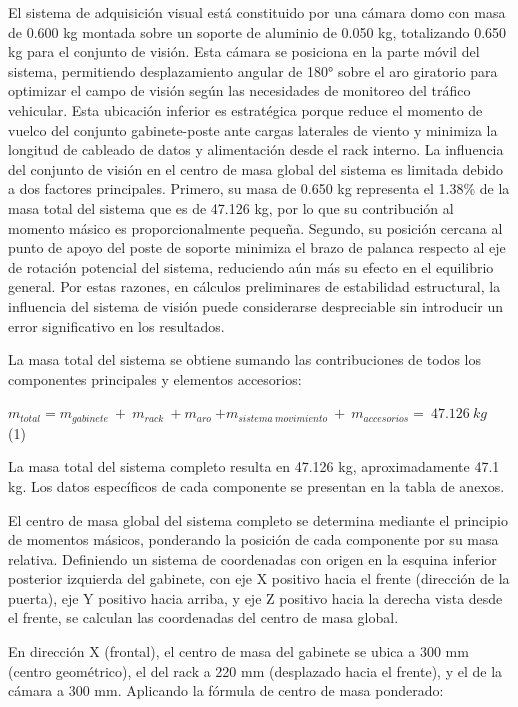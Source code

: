 \documentclass[12pt,a4paper,oneside]{report}
\begin{document}
El sistema de adquisición visual está constituido por una cámara domo con masa de 0.600 kg montada sobre un soporte de aluminio de 0.050 kg, totalizando 0.650 kg para el conjunto de visión. Esta cámara se posiciona en la parte móvil del sistema, permitiendo desplazamiento angular de 180° sobre el aro giratorio para optimizar el campo de visión según las necesidades de monitoreo del tráfico vehicular. Esta ubicación inferior es estratégica porque reduce el momento de vuelco del conjunto gabinete-poste ante cargas laterales de viento y minimiza la longitud de cableado de datos y alimentación desde el rack interno. La influencia del conjunto de visión en el centro de masa global del sistema es limitada debido a dos factores principales. Primero, su masa de 0.650 kg representa el 1.38\% de la masa total del sistema que es de 47.126 kg, por lo que su contribución al momento másico es proporcionalmente pequeña. Segundo, su posición cercana al punto de apoyo del poste de soporte minimiza el brazo de palanca respecto al eje de rotación potencial del sistema, reduciendo aún más su efecto en el equilibrio general. Por estas razones, en cálculos preliminares de estabilidad estructural, la influencia del sistema de visión puede considerarse despreciable sin introducir un error significativo en los resultados.

La masa total del sistema se obtiene sumando las contribuciones de todos los componentes principales y elementos accesorios:

\(m_{total} = m_{gabinete}\  + \ m_{rack}\  + m_{aro}\ {+ m}_{sistema\ movimiento}\  + \ m_{accesorios} = \ 47.126\ kg\ \) (1)

La masa total del sistema completo resulta en 47.126 kg, aproximadamente 47.1 kg. Los datos específicos de cada componente se presentan en la tabla de anexos.

El centro de masa global del sistema completo se determina mediante el principio de momentos másicos, ponderando la posición de cada componente por su masa relativa. Definiendo un sistema de coordenadas con origen en la esquina inferior posterior izquierda del gabinete, con eje X positivo hacia el frente (dirección de la puerta), eje Y positivo hacia arriba, y eje Z positivo hacia la derecha vista desde el frente, se calculan las coordenadas del centro de masa global.

En dirección X (frontal), el centro de masa del gabinete se ubica a 300 mm (centro geométrico), el del rack a 220 mm (desplazado hacia el frente), y el de la cámara a 300 mm. Aplicando la fórmula de centro de masa ponderado:
\end{document}
